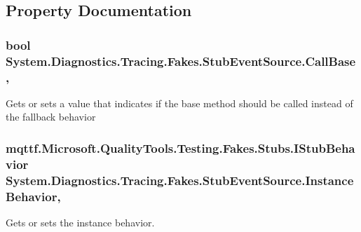 \subsection{Property Documentation}
\hypertarget{class_system_1_1_diagnostics_1_1_tracing_1_1_fakes_1_1_stub_event_source_a09f475c177032a6ff766b5bff99d4273}{
\subsubsection[{Call\-Base}]{\setlength{\rightskip}{0pt plus 5cm}bool System.\-Diagnostics.\-Tracing.\-Fakes.\-Stub\-Event\-Source.\-Call\-Base\hspace{0.3cm}{\ttfamily [get]}, {\ttfamily [set]}}}\label{class_system_1_1_diagnostics_1_1_tracing_1_1_fakes_1_1_stub_event_source_a09f475c177032a6ff766b5bff99d4273}


Gets or sets a value that indicates if the base method should be called instead of the fallback behavior

\hypertarget{class_system_1_1_diagnostics_1_1_tracing_1_1_fakes_1_1_stub_event_source_a6ce59fa8e1d7c2e0fddbe4a90cd553ee}{
\subsubsection[{Instance\-Behavior}]{\setlength{\rightskip}{0pt plus 5cm}mqttf.\-Microsoft.\-Quality\-Tools.\-Testing.\-Fakes.\-Stubs.\-I\-Stub\-Behavior System.\-Diagnostics.\-Tracing.\-Fakes.\-Stub\-Event\-Source.\-Instance\-Behavior\hspace{0.3cm}{\ttfamily [get]}, {\ttfamily [set]}}}\label{class_system_1_1_diagnostics_1_1_tracing_1_1_fakes_1_1_stub_event_source_a6ce59fa8e1d7c2e0fddbe4a90cd553ee}


Gets or sets the instance behavior.

